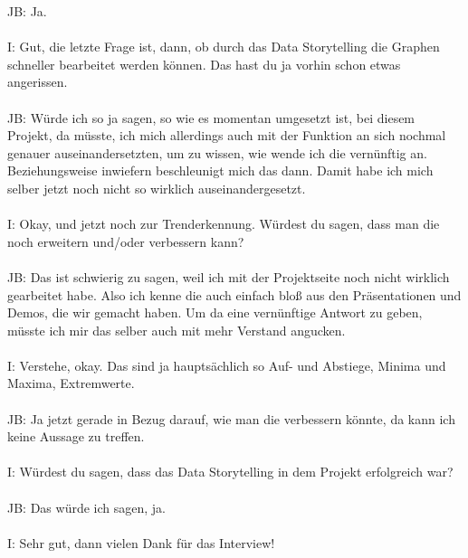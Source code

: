 \begin{linenumbers}
JB: Ja.\\\\
I: Gut, die letzte Frage ist, dann, ob durch das Data Storytelling die Graphen schneller bearbeitet werden können. Das hast du ja vorhin schon etwas angerissen.\\\\
JB:  Würde ich so ja sagen, so wie es momentan umgesetzt ist, bei diesem Projekt, da müsste, ich mich allerdings auch mit der Funktion an sich nochmal genauer auseinandersetzten, um zu wissen, wie wende ich die vernünftig an. Beziehungsweise inwiefern beschleunigt mich das dann. Damit habe ich mich selber jetzt noch nicht so wirklich auseinandergesetzt.\\\\
I: Okay, und jetzt noch zur Trenderkennung. Würdest du sagen, dass man die noch erweitern und/oder verbessern kann?\\\\
JB: Das ist schwierig zu sagen, weil ich mit der Projektseite noch nicht wirklich gearbeitet habe. Also ich kenne die auch einfach bloß aus den Präsentationen und Demos, die wir gemacht haben. Um da eine vernünftige Antwort zu geben, müsste ich mir das selber auch mit mehr Verstand angucken.\\\\
I: Verstehe, okay. Das sind ja hauptsächlich so Auf- und Abstiege, Minima und Maxima, Extremwerte.\\\\
JB: Ja jetzt gerade in Bezug darauf, wie man die verbessern könnte, da kann ich keine Aussage zu treffen.\\\\
I: Würdest du sagen, dass das Data Storytelling in dem Projekt erfolgreich war?\\\\
JB: Das würde ich sagen, ja.\\\\
I: Sehr gut, dann vielen Dank für das Interview!
\end{linenumbers}